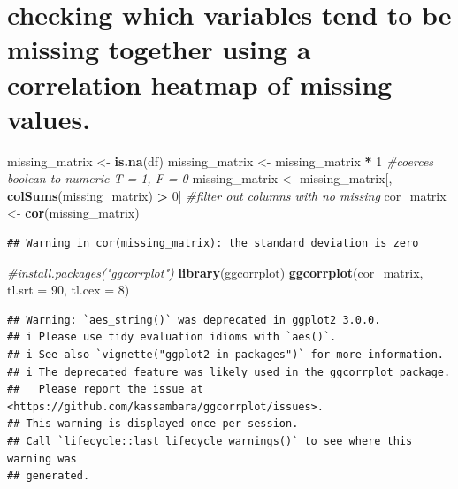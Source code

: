\documentclass[
]{article}
\newenvironment{Shaded}{\begin{snugshade}}{\end{snugshade}}
\newcommand{\AttributeTok}[1]{\textcolor[rgb]{0.13,0.29,0.53}{#1}}
\newcommand{\CommentTok}[1]{\textcolor[rgb]{0.56,0.35,0.01}{\textit{#1}}}
\newcommand{\DecValTok}[1]{\textcolor[rgb]{0.00,0.00,0.81}{#1}}
\newcommand{\FunctionTok}[1]{\textcolor[rgb]{0.13,0.29,0.53}{\textbf{#1}}}
\newcommand{\NormalTok}[1]{#1}
\newcommand{\OtherTok}[1]{\textcolor[rgb]{0.56,0.35,0.01}{#1}}
\newcommand{\SpecialCharTok}[1]{\textcolor[rgb]{0.81,0.36,0.00}{\textbf{#1}}}
\begin{document}
\section{checking which variables tend to be missing together using a
correlation heatmap of missing
values.}\label{checking-which-variables-tend-to-be-missing-together-using-a-correlation-heatmap-of-missing-values.}

\begin{Shaded}
\begin{Highlighting}[]
\NormalTok{missing\_matrix }\OtherTok{\textless{}{-}} \FunctionTok{is.na}\NormalTok{(df)}
\NormalTok{missing\_matrix }\OtherTok{\textless{}{-}}\NormalTok{ missing\_matrix }\SpecialCharTok{*} \DecValTok{1} \CommentTok{\#coerces boolean to numeric T = 1, F = 0}
\NormalTok{missing\_matrix }\OtherTok{\textless{}{-}}\NormalTok{ missing\_matrix[, }\FunctionTok{colSums}\NormalTok{(missing\_matrix) }\SpecialCharTok{\textgreater{}} \DecValTok{0}\NormalTok{] }\CommentTok{\#filter out columns with no missing }
\NormalTok{cor\_matrix }\OtherTok{\textless{}{-}} \FunctionTok{cor}\NormalTok{(missing\_matrix)}
\end{Highlighting}
\end{Shaded}

\begin{verbatim}
## Warning in cor(missing_matrix): the standard deviation is zero
\end{verbatim}

\begin{Shaded}
\begin{Highlighting}[]
\CommentTok{\#install.packages("ggcorrplot")}
\FunctionTok{library}\NormalTok{(ggcorrplot)}
\FunctionTok{ggcorrplot}\NormalTok{(cor\_matrix, }\AttributeTok{tl.srt =} \DecValTok{90}\NormalTok{, }\AttributeTok{tl.cex =} \DecValTok{8}\NormalTok{)}
\end{Highlighting}
\end{Shaded}

\begin{verbatim}
## Warning: `aes_string()` was deprecated in ggplot2 3.0.0.
## i Please use tidy evaluation idioms with `aes()`.
## i See also `vignette("ggplot2-in-packages")` for more information.
## i The deprecated feature was likely used in the ggcorrplot package.
##   Please report the issue at <https://github.com/kassambara/ggcorrplot/issues>.
## This warning is displayed once per session.
## Call `lifecycle::last_lifecycle_warnings()` to see where this warning was
## generated.
\end{verbatim}
\end{document}
